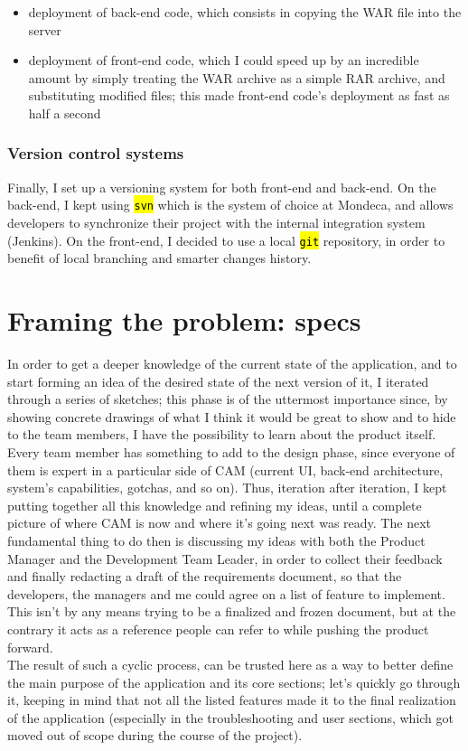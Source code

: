 \documentclass[12pt,svgnames]{memoir}
\let\OldTexttt\texttt
\renewcommand{\texttt}[1]{\OldTexttt{\hl{#1}}}
\begin{document}
\begin{itemize}
\itemsep1pt\parskip0pt
\item
  deployment of back-end code, which consists in copying the WAR file
  into the server
\item
  deployment of front-end code, which I could speed up by an incredible
  amount by simply treating the WAR archive as a simple RAR archive, and
  substituting modified files; this made front-end code's deployment as
  fast as half a second
\end{itemize}

\subsubsection*{Version control systems}\label{version-control-systems}

Finally, I set up a versioning system for both front-end and back-end.
On the back-end, I kept using \texttt{svn} which is the system of choice
at Mondeca, and allows developers to synchronize their project with the
internal integration system (Jenkins). On the front-end, I decided to
use a local \texttt{git} repository, in order to benefit of local
branching and smarter changes history.

\section{Framing the problem: specs}\label{framing-the-problem-specs}

In order to get a deeper knowledge of the current state of the
application, and to start forming an idea of the desired state of the
next version of it, I iterated through a series of sketches; this phase
is of the uttermost importance since, by showing concrete drawings of
what I think it would be great to show and to hide to the team members,
I have the possibility to learn about the product itself. Every team
member has something to add to the design phase, since everyone of them
is expert in a particular side of CAM (current UI, back-end
architecture, system's capabilities, gotchas, and so on). Thus,
iteration after iteration, I kept putting together all this knowledge
and refining my ideas, until a complete picture of where CAM is now and
where it's going next was ready. The next fundamental thing to do then
is discussing my ideas with both the Product Manager and the Development
Team Leader, in order to collect their feedback and finally redacting a
draft of the requirements document, so that the developers, the managers
and me could agree on a list of feature to implement. This isn't by any
means trying to be a finalized and frozen document, but at the contrary
it acts as a reference people can refer to while pushing the product
forward.\\The result of such a cyclic process, can be trusted here as a
way to better define the main purpose of the application and its core
sections; let's quickly go through it, keeping in mind that not all the
listed features made it to the final realization of the application
(especially in the troubleshooting and user sections, which got moved
out of scope during the course of the project).
\end{document}
